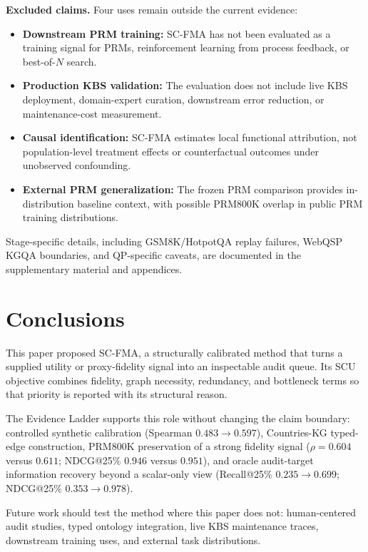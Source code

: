\documentclass[a4paper,fleqn]{cas-sc}
\begin{document}
\medskip
\noindent\textbf{Excluded claims.} Four uses remain outside the current evidence:
\begin{itemize}
  \item \textbf{Downstream PRM training:} SC-FMA has not been evaluated as a training signal for PRMs, reinforcement learning from process feedback, or best-of-$N$ search.
  \item \textbf{Production KBS validation:} The evaluation does not include live KBS deployment, domain-expert curation, downstream error reduction, or maintenance-cost measurement.
  \item \textbf{Causal identification:} SC-FMA estimates local functional attribution, not population-level treatment effects or counterfactual outcomes under unobserved confounding.
  \item \textbf{External PRM generalization:} The frozen PRM comparison provides in-distribution baseline context, with possible PRM800K overlap in public PRM training distributions.
\end{itemize}

\noindent Stage-specific details, including GSM8K/HotpotQA replay failures, WebQSP KGQA boundaries, and QP-specific caveats, are documented in the supplementary material and appendices.

\section{Conclusions}
\label{sec:conclusions}

This paper proposed SC-FMA, a structurally calibrated method that turns a supplied utility or proxy-fidelity signal into an inspectable audit queue. Its SCU objective combines fidelity, graph necessity, redundancy, and bottleneck terms so that priority is reported with its structural reason.

The Evidence Ladder supports this role without changing the claim boundary: controlled synthetic calibration (Spearman $0.483 \rightarrow 0.597$), Countries-KG typed-edge construction, PRM800K preservation of a strong fidelity signal ($\rho = 0.604$ versus $0.611$; NDCG@25\% $0.946$ versus $0.951$), and oracle audit-target information recovery beyond a scalar-only view (Recall@25\% $0.235 \rightarrow 0.699$; NDCG@25\% $0.353 \rightarrow 0.978$).

Future work should test the method where this paper does not: human-centered audit studies, typed ontology integration, live KBS maintenance traces, downstream training uses, and external task distributions.
\end{document}
